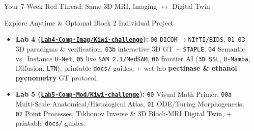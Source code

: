 \documentclass[aspectratio=169, 10pt]{beamer}
\begin{document}
\begin{frame}{Your 7-Week Red Thread: Same 3D MRI, Imaging $\leftrightarrow$ Digital Twin}
    \vspace{0.15cm}
    \begin{block}{Explore Anytime \& Optional Block 2 Individual Project}
        \scriptsize
        \begin{itemize}
            \item \textbf{Lab 4 (\href{https://github.com/arvidl/BMED365-2027/tree/main/Lab4-Comp-Imag/Kiwi-challenge}{\texttt{Lab4-Comp-Imag/Kiwi-challenge}}):} \texttt{00} \texttt{DICOM$\to$NIfTI/BIDS}, \texttt{01--03} 3D paradigms \& verification, \texttt{03b} interactive 3D GT + \texttt{STAPLE}, \texttt{04} Semantic vs.\ Instance \texttt{U-Net}, \texttt{05} live \texttt{SAM\,2.1/MedSAM}, \texttt{06} frontier AI (\texttt{3D SSL}, \texttt{U-Mamba}, Diffusion, \texttt{LTN}), printable \texttt{docs/} guides, + wet-lab \textbf{pectinase \& ethanol pycnometry} GT protocol.
            \item \textbf{Lab 5 (\href{https://github.com/arvidl/BMED365-2027/tree/main/Lab5-Comp-Mod/Kiwi-challenge}{\texttt{Lab5-Comp-Mod/Kiwi-challenge}}):} \texttt{00} Visual Math Primer, \texttt{00a} Multi-Scale Anatomical/Histological Atlas, \texttt{01} ODE/Turing Morphogenesis, \texttt{02} Point Processes, Tikhonov Inverse \& 3D Bloch-MRI Digital Twin, + printable \texttt{docs/} guides.
        \end{itemize}
    \end{block}
\end{frame}
\end{document}
